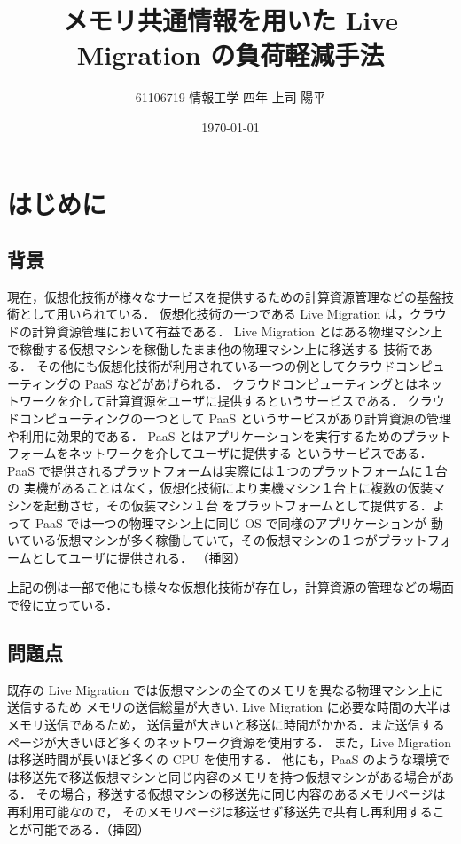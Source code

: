 \documentclass[graduation-thesis]{mlarticle}
\author{61106719 情報工学 四年 上司 陽平}
\date{\today}
\title{メモリ共通情報を用いた Live Migration の負荷軽減手法}
\begin{document}
\maketitle

\tableofcontents
\clearpage

\section{はじめに}
\label{sec-1}
\subsection{背景}
\label{sec-1-1}
現在，仮想化技術が様々なサービスを提供するための計算資源管理などの基盤技術として用いられている．
仮想化技術の一つである Live Migration は，クラウドの計算資源管理において有益である．
Live Migration とはある物理マシン上で稼働する仮想マシンを稼働したまま他の物理マシン上に移送する
技術である．
その他にも仮想化技術が利用されている一つの例としてクラウドコンピューティングの PaaS などがあげられる．
クラウドコンピューティングとはネットワークを介して計算資源をユーザに提供するというサービスである．
クラウドコンピューティングの一つとして PaaS というサービスがあり計算資源の管理や利用に効果的である．
PaaS とはアプリケーションを実行するためのプラットフォームをネットワークを介してユーザに提供する
というサービスである．PaaS で提供されるプラットフォームは実際には１つのプラットフォームに１台の
実機があることはなく，仮想化技術により実機マシン１台上に複数の仮装マシンを起動させ，その仮装マシン１台
をプラットフォームとして提供する．よって PaaS では一つの物理マシン上に同じ OS で同様のアプリケーションが
動いている仮想マシンが多く稼働していて，その仮想マシンの１つがプラットフォームとしてユーザに提供される．
（挿図）

上記の例は一部で他にも様々な仮想化技術が存在し，計算資源の管理などの場面で役に立っている．

\subsection{問題点}
\label{sec-1-2}
既存の Live Migration では仮想マシンの全てのメモリを異なる物理マシン上に送信するため
メモリの送信総量が大きい.
Live Migration に必要な時間の大半はメモリ送信であるため，
送信量が大きいと移送に時間がかかる．また送信するページが大きいほど多くのネットワーク資源を使用する．
また，Live Migration は移送時間が長いほど多くの CPU を使用する．
他にも，PaaS のような環境では移送先で移送仮想マシンと同じ内容のメモリを持つ仮想マシンがある場合がある．
その場合，移送する仮想マシンの移送先に同じ内容のあるメモリページは再利用可能なので，
そのメモリページは移送せず移送先で共有し再利用することが可能である．（挿図）
\end{document}

